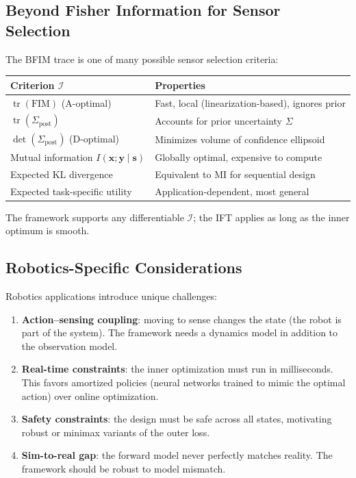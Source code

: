 \documentclass[11pt,a4paper]{article}
\newcommand{\tr}{\operatorname{tr}}
\begin{document}
\subsection{Beyond Fisher Information for Sensor Selection}

The BFIM trace is one of many possible sensor selection criteria:
\begin{center}
\begin{tabular}{@{}p{4cm}p{9cm}@{}}
\toprule
Criterion $\mathcal{I}$ & Properties \\
\midrule
$\tr(\text{FIM})$ (A-optimal) & Fast, local (linearization-based), ignores prior \\
$\tr(\Sigma_{\text{post}})$ & Accounts for prior uncertainty $\Sigma$ \\
$\det(\Sigma_{\text{post}})$ (D-optimal) & Minimizes volume of confidence ellipsoid \\
Mutual information $I(\bm{x}; \bm{y} \mid \bm{s})$ & Globally optimal, expensive to compute \\
Expected KL divergence & Equivalent to MI for sequential design \\
Expected task-specific utility & Application-dependent, most general \\
\bottomrule
\end{tabular}
\end{center}

The framework supports any differentiable $\mathcal{I}$; the IFT applies as long as the inner optimum is smooth.

\subsection{Robotics-Specific Considerations}

Robotics applications introduce unique challenges:
\begin{enumerate}[nosep]
  \item \textbf{Action--sensing coupling}: moving to sense changes the state (the robot is part of the system).  The framework needs a dynamics model in addition to the observation model.
  \item \textbf{Real-time constraints}: the inner optimization must run in milliseconds.  This favors amortized policies (neural networks trained to mimic the optimal action) over online optimization.
  \item \textbf{Safety constraints}: the design must be safe across all states, motivating robust or minimax variants of the outer loss.
  \item \textbf{Sim-to-real gap}: the forward model never perfectly matches reality.  The framework should be robust to model mismatch.
\end{enumerate}
\end{document}
